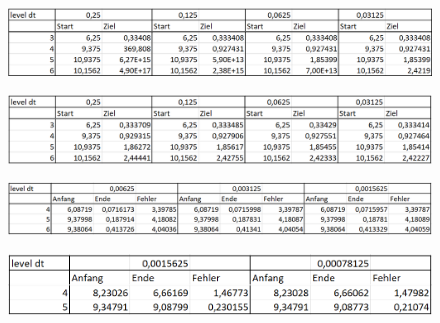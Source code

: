 

	
\begin{figure}[H]
	\centering
	\includegraphics[width=\textwidth]{../Aufgabe21/rkorder4RiemannEnergieTabelle.png}
	
\end{figure}

\begin{figure}[H]
	\centering
	\includegraphics[width=\textwidth]{../Aufgabe21/rkorder-2RiemannEnergieTabelle.png}
	
\end{figure}

\begin{figure}[H]
	\centering
	\includegraphics[width=\textwidth]{../Aufgabe21/deg=0CircleWaveEnergieTabelle.png}
	
\end{figure}

\begin{figure}[H]
	\centering
	\includegraphics[width=\textwidth]{../Aufgabe21/deg=2CircleWaveEnergieTabelle.png}
	
\end{figure}